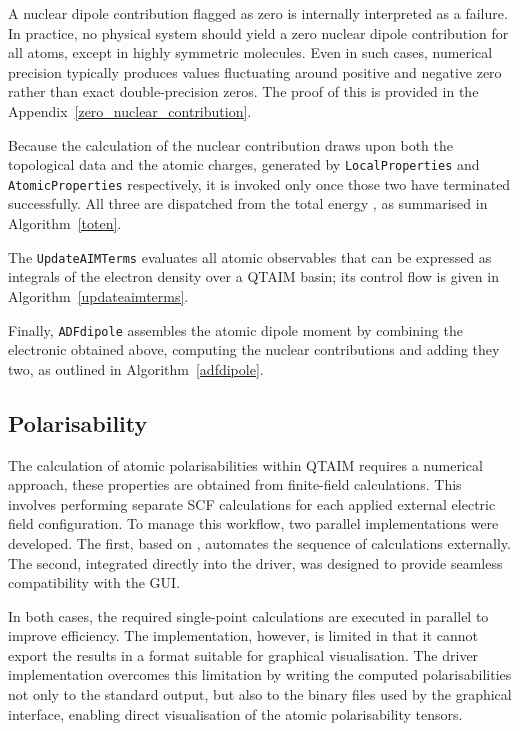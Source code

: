 \newpage
A nuclear dipole contribution flagged as zero is internally interpreted
as a failure. In practice, no physical system should yield a zero
nuclear dipole contribution for all atoms, except in highly symmetric
molecules. Even in such cases, numerical precision typically produces
values fluctuating around positive and negative zero
rather than exact double-precision zeros. The proof of this is
provided in the Appendix~\ref{zero_nuclear_contribution}.

Because the calculation of the nuclear contribution draws upon both the
topological data and the atomic charges, generated by \texttt{LocalProperties}
and \texttt{AtomicProperties} respectively, it is invoked only once those two
\subroutines have terminated successfully. All three \subroutines are
dispatched from the total energy \subroutine, as summarised in
Algorithm~\ref{toten}.



\newpage
The \texttt{UpdateAIMTerms} \subroutine evaluates all atomic observables
that can be expressed as integrals of the electron density over a
\gls{QTAIM} basin; its control flow is given in
Algorithm~\ref{updateaimterms}.



Finally, \texttt{ADFdipole} assembles the atomic dipole moment by combining the
electronic obtained above, computing the nuclear contributions and adding they
two, as outlined in Algorithm~\ref{adfdipole}.



\newpage
\subsection{Polarisability}

The calculation of atomic polarisabilities within \gls{QTAIM} requires a
numerical approach, these properties are obtained from finite-field
calculations. This involves performing separate \gls{SCF} calculations for each
applied external electric field configuration. To manage this workflow, two
parallel implementations were developed. The first, based on \plams, automates
the sequence of calculations externally. The second, integrated directly into
the \ams driver, was designed to provide seamless compatibility with the
\gls{GUI}.

In both cases, the required single-point calculations are executed in parallel
to improve efficiency. The \plams implementation, however, is limited in that
it cannot export the results in a format suitable for graphical visualisation.
The \ams driver implementation overcomes this limitation by writing the
computed polarisabilities not only to the standard output, but also to the
binary files used by the \ams graphical interface, enabling direct
visualisation of the atomic polarisability tensors.

